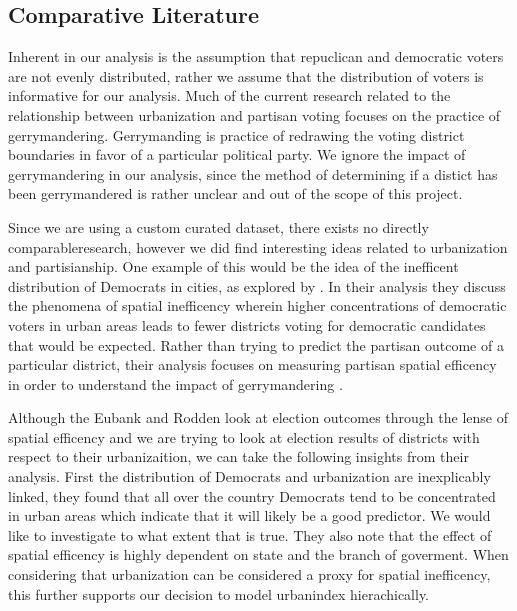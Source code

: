 \documentclass[12pt]{article}
\begin{document}
\subsection*{Comparative Literature}
Inherent in our analysis is the assumption that repuclican and democratic voters are not evenly distributed, rather we assume that the distribution of voters is informative for our analysis. Much of the current research related to the relationship between urbanization and partisan voting focuses on the practice of gerrymandering. Gerrymanding is practice of redrawing the voting district boundaries in favor of a particular political party. We ignore the impact of gerrymandering in our analysis, since the method of determining if a distict has been gerrymandered is rather unclear and out of the scope of this project.

Since we are using a custom curated dataset, there exists no directly comparableresearch, however we did find interesting ideas related to urbanization and partisianship. One example of this would be the idea of the inefficent distribution of Democrats in cities, as explored by \cite{spatialefficency}. In their analysis they discuss the phenomena of spatial inefficency wherein higher concentrations of democratic voters in urban areas leads to fewer districts voting for democratic candidates that would be expected. Rather than trying to predict the partisan outcome of a particular district, their analysis focuses on measuring partisan spatial efficency in order to understand the impact of gerrymandering \parencite{spatialefficency}. 

Although the Eubank and Rodden look at election outcomes through the lense of spatial efficency and we are trying to look at election results of districts with respect to their urbanizaition, we can take the following insights from their analysis. First the distribution of Democrats and urbanization are inexplicably linked, they found that all over the country Democrats tend to be concentrated in urban areas which indicate that it will likely be a good predictor. We would like to investigate to what extent that is true. They also note that the effect of spatial efficency is highly dependent on state and the branch of goverment. When considering that urbanization can be considered a proxy for spatial inefficency, this further supports our decision to model urbanindex hierachically. 




\end{document}
